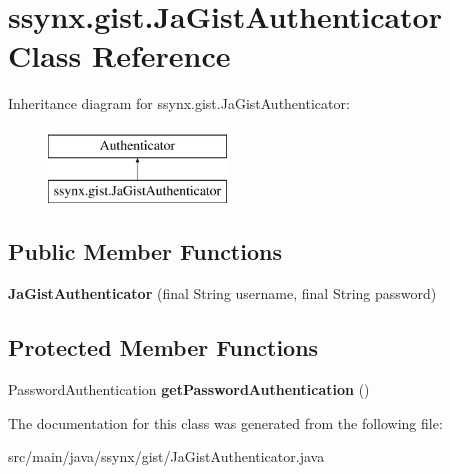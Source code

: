 \hypertarget{classssynx_1_1gist_1_1JaGistAuthenticator}{}\section{ssynx.\+gist.\+Ja\+Gist\+Authenticator Class Reference}
\label{classssynx_1_1gist_1_1JaGistAuthenticator}
Inheritance diagram for ssynx.\+gist.\+Ja\+Gist\+Authenticator\+:\begin{figure}[H]
\begin{center}
\leavevmode
\includegraphics[height=2.000000cm]{classssynx_1_1gist_1_1JaGistAuthenticator}
\end{center}
\end{figure}
\subsection*{Public Member Functions}
\begin{DoxyCompactItemize}
\item 
\mbox{\label{classssynx_1_1gist_1_1JaGistAuthenticator_aa0df6163fc01539bc1caacd31411ef99}} 
{\bfseries Ja\+Gist\+Authenticator} (final String username, final String password)
\end{DoxyCompactItemize}
\subsection*{Protected Member Functions}
\begin{DoxyCompactItemize}
\item 
\mbox{\label{classssynx_1_1gist_1_1JaGistAuthenticator_a2f1dbfe031425fd44e635634b669f575}} 
Password\+Authentication {\bfseries get\+Password\+Authentication} ()
\end{DoxyCompactItemize}


The documentation for this class was generated from the following file\+:\begin{DoxyCompactItemize}
\item 
src/main/java/ssynx/gist/Ja\+Gist\+Authenticator.\+java\end{DoxyCompactItemize}
